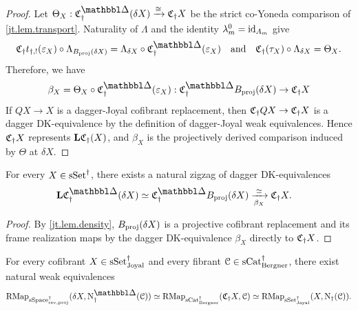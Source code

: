 \documentclass[a4paper,dvipdfmx,11pt]{amsart}
\begin{document}
\begin{proof}
  Let $\Theta_X:\frakC^\prism_{\dag}(\delta X)\xrightarrow{\cong}\frakC_{\dag}X$ be the strict co-Yoneda comparison of \cref{jt.lem.transport}.
  Naturality of $\Lambda$ and the identity $\lambda_m^0=\operatorname{id}_{A_m}$ give
  \begin{align}
    \frakC_{\dag}t_{\dag,!}(\varepsilon_X)
      \circ\Lambda_{B_{\proj}(\delta X)}
    =
    \Lambda_{\delta X} \circ\frakC^\prism_{\dag}(\varepsilon_X)
    \quad \text{and} \quad
    \frakC_{\dag}(\tau_X)\circ\Lambda_{\delta X}
    =
    \Theta_X.
  \end{align}
  Therefore, we have 
  \begin{align}
    \beta_X =\Theta_X\circ\frakC^\prism_{\dag}(\varepsilon_X)
    :\frakC^{\prism}_{\dag}B_{\proj}(\delta X) \to \frakC_{\dag}X
  \end{align}
  If $QX\to X$ is a dagger-Joyal cofibrant replacement, then $\mathfrak{C}_{\dag}QX\to\mathfrak{C}_{\dag}X$ is a dagger DK-equivalence by the definition of dagger-Joyal weak equivalences.
  Hence $\mathfrak{C}_{\dag}X$ represents $\mathbf{L}\mathfrak{C}_{\dag}(X)$, and $\beta_X$ is the projectively derived comparison induced by $\Theta$ at $\delta X$.
\end{proof}

\begin{corollary}\label{jt.lem.transport-realization}
  For every $X\in\mathrm{sSet}^{\dag}$, there exists a natural zigzag of dagger DK-equivalences
  \begin{align}\label{jt.eq.transport-realization}
    \bfL\frakC^{\prism}_{\dag}(\delta X)
    &\simeq
    \frakC^{\prism}_{\dag}B_{\proj}(\delta X)
    \xrightarrow[\beta_X]{\simeq}
    \frakC_{\dag}X.
  \end{align}
\end{corollary}

\begin{proof}
  By \cref{jt.lem.density}, $B_{\mathrm{proj}}(\delta X)$ is a projective cofibrant replacement and its frame realization maps by the dagger DK-equivalence $\beta_X$ directly to $\mathfrak{C}_{\dag}X$.
\end{proof}

\begin{corollary}\label{jt.cor.transport-mapping}
  For every cofibrant $X \in \mathrm{sSet}^{\dag}_{\mathrm{Joyal}}$ and every fibrant $\mathcal{C} \in \mathrm{sCat}^{\dag}_{\mathrm{Bergner}}$, there exist natural weak equivalences
  \begin{align}
    \RMap_{\sSpace^{\dag}_{\rev,\proj}}(\delta X,\N^{\prism}_{\dag}(\calC))
    \simeq
    \RMap_{\sCat^{\dag}_{\Bergner}}(\frakC_{\dag}X,\calC)
    \simeq
    \RMap_{\sSet^{\dag}_{\Joyal}}(X,\N_{\dag}(\calC)).
  \end{align}
\end{corollary}
\end{document}
